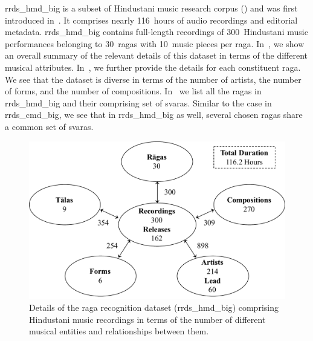 {{{{\acrshort{rrds_hmd_big} is a subset of Hindustani music research corpus () and was first introduced in~\cite{gulati_tdms_2016}. It comprises nearly 116\, hours of audio recordings and editorial metadata. \acrshort{rrds_hmd_big} contains full-length recordings of 300~Hindustani music performances belonging to 30~\glspl{raga} with 10~music pieces per \gls{raga}. In~, we show an overall summary of the relevant details of this dataset in terms of the different musical attributes. In~, we further provide the details for each constituent \gls{raga}. We see that the dataset is diverse in terms of the number of artists, the number of forms, and the number of compositions. In~ we list all the \glspl{raga} in \acrshort{rrds_hmd_big} and their comprising set of \glspl{svara}. Similar to the case in \acrshort{rrds_cmd_big}, we see that in \acrshort{rrds_hmd_big} as well, several chosen \glspl{raga} share a common set of \glspl{svara}. 




\begin{figure}
	\begin{center}
		\includegraphics[width=\figSizeNinety]{ch04_datasets/figures/hindustani_corpus_ragaDB.pdf}
	\end{center}
	\caption[Details of the \gls{raga} recognition dataset comprising Hindustani music recordings]{Details of the \gls{raga} recognition dataset (\acrshort{rrds_hmd_big}) comprising Hindustani music recordings in terms of the number of different musical entities and relationships between them.}
	\label{fig:hindustani_ragaDB_details}
\end{figure}


}}}}
